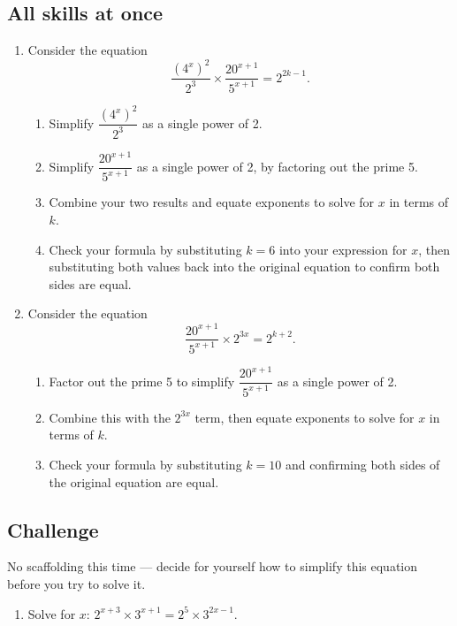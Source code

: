 \documentclass[11pt]{article}
\newcommand{\qspace}{\vspace{0.65cm}}
\begin{document}
\subsection*{All skills at once}

\begin{enumerate}[resume]
  \item Consider the equation
  \[
    \frac{(4^{x})^{2}}{2^{3}} \times \frac{20^{x+1}}{5^{x+1}} = 2^{2k-1}.
  \]
  \begin{enumerate}
    \item Simplify $\dfrac{(4^{x})^{2}}{2^{3}}$ as a single power of 2.
    \item Simplify $\dfrac{20^{x+1}}{5^{x+1}}$ as a single power of 2, by factoring out the prime 5.
    \item Combine your two results and equate exponents to solve for $x$ in terms of $k$.
    \item Check your formula by substituting $k = 6$ into your expression for $x$, then substituting both values back into the original equation to confirm both sides are equal.
  \end{enumerate}
  \qspace

  \item Consider the equation
  \[
    \frac{20^{x+1}}{5^{x+1}} \times 2^{3x} = 2^{k+2}.
  \]
  \begin{enumerate}
    \item Factor out the prime 5 to simplify $\dfrac{20^{x+1}}{5^{x+1}}$ as a single power of 2.
    \item Combine this with the $2^{3x}$ term, then equate exponents to solve for $x$ in terms of $k$.
    \item Check your formula by substituting $k = 10$ and confirming both sides of the original equation are equal.
  \end{enumerate}
  \qspace
\end{enumerate}

\subsection*{Challenge}
No scaffolding this time --- decide for yourself how to simplify this equation before you try to solve it.

\begin{enumerate}[resume]
  \item Solve for $x$: \quad $2^{x+3} \times 3^{x+1} = 2^{5} \times 3^{2x-1}$.
  \qspace
\end{enumerate}
\end{document}
